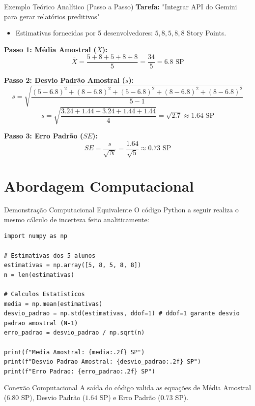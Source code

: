 \documentclass[10pt]{beamer}
\begin{document}
\begin{frame}{Exemplo Teórico Analítico (Passo a Passo)}
    \textbf{Tarefa:} "Integrar API do Gemini para gerar relatórios preditivos"
    \begin{itemize}
        \item Estimativas fornecidas por 5 desenvolvedores: $5, 8, 5, 8, 8$ Story Points.
    \end{itemize}
    
    \textbf{Passo 1: Média Amostral ($\bar{X}$):}
    $$\bar{X} = \frac{5 + 8 + 5 + 8 + 8}{5} = \frac{34}{5} = 6.8 \text{ SP}$$
    
    \textbf{Passo 2: Desvio Padrão Amostral ($s$):}
    $$s = \sqrt{\frac{(5-6.8)^2 + (8-6.8)^2 + (5-6.8)^2 + (8-6.8)^2 + (8-6.8)^2}{5 - 1}}$$
    $$s = \sqrt{\frac{3.24 + 1.44 + 3.24 + 1.44 + 1.44}{4}} = \sqrt{2.7} \approx 1.64 \text{ SP}$$
    
    \textbf{Passo 3: Erro Padrão ($SE$):}
    $$SE = \frac{s}{\sqrt{N}} = \frac{1.64}{\sqrt{5}} \approx 0.73 \text{ SP}$$
\end{frame}

\section{Abordagem Computacional}
\begin{frame}[fragile]{Demonstração Computacional Equivalente}
    O código Python a seguir realiza o mesmo cálculo de incerteza feito analiticamente:
\begin{lstlisting}
import numpy as np

# Estimativas dos 5 alunos
estimativas = np.array([5, 8, 5, 8, 8])
n = len(estimativas)

# Calculos Estatisticos
media = np.mean(estimativas)
desvio_padrao = np.std(estimativas, ddof=1) # ddof=1 garante desvio padrao amostral (N-1)
erro_padrao = desvio_padrao / np.sqrt(n)

print(f"Media Amostral: {media:.2f} SP")
print(f"Desvio Padrao Amostral: {desvio_padrao:.2f} SP")
print(f"Erro Padrao: {erro_padrao:.2f} SP")
\end{lstlisting}
    \begin{block}{Conexão Computacional}
        A saída do código valida as equações de Média Amostral ($6.80$ SP), Desvio Padrão ($1.64$ SP) e Erro Padrão ($0.73$ SP).
    \end{block}
\end{frame}
\end{document}
